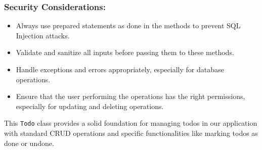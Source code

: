 \documentclass[11pt]{article}
\begin{document}
\subsubsection{Security Considerations:}
\label{sec:org57b85d8}
\begin{itemize}
\item Always use prepared statements as done in the methods to prevent SQL
Injection attacks.
\item Validate and sanitize all inputs before passing them to these methods.
\item Handle exceptions and errors appropriately, especially for database
operations.
\item Ensure that the user performing the operations has the right
permissions, especially for updating and deleting operations.
\end{itemize}

This \texttt{Todo} class provides a solid foundation for managing todos in our
application with standard CRUD operations and specific functionalities
like marking todos as done or undone.
\end{document}
